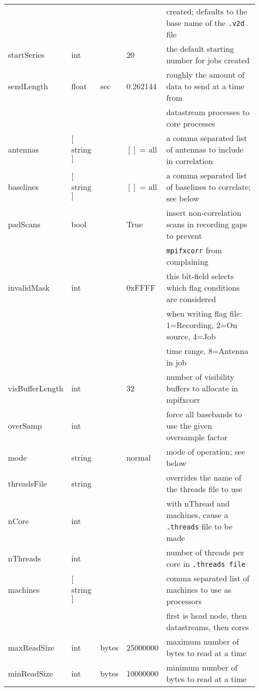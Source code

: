 \begin{center}
\begin{tabular}{l l l l l}
                 &        &       &              & created; defaults to the base name of the {\tt .v2d} file \\
startSeries      & int    &       & 20           & the default starting number for jobs created \\
sendLength       & float  & sec   & 0.262144     & roughly the amount of data to send at a time from \\
                 &        &       &              & datastream processes to core processes \\
antennas         & $[$string$]$ &  & $[ ]$ = all & a comma separated list of antennas to include in correlation \\
baselines        & $[$string$]$ &  & $[ ]$ = all & a comma separated list of baselines to correlate; see below \\
padScans         & bool   &       & True         & insert non-correlation scans in recording gaps to prevent \\
                 &        &       &              & {\tt mpifxcorr} from complaining \\
invalidMask      & int    &       & 0xFFFF       & this bit-field selects which flag conditions are considered \\
                 &        &       &              & when writing flag file: 1=Recording, 2=On source, 4=Job \\
		 &        &       &              & time range, 8=Antenna in job \\
visBufferLength  & int    &       & 32           & number of visibility buffers to allocate in mpifxcorr \\
overSamp         & int    &       &              & force all basebands to use the given oversample factor \\
mode             & string &       & normal       & mode of operation; see below \\
threadsFile      & string &       &              & overrides the name of the threads file to use \\
nCore            & int    &       &              & with nThread and machines, cause a {\tt .threads} file to be made \\
nThreads         & int    &       &              & number of threads per core in {\tt .threads file} \\
machines         & $[$string$]$ & &              & comma separated list of machines to use as processors \\
                 &        &       &              & first is head node, then datastreams, then cores \\
maxReadSize      & int    & bytes & 25000000     & maximum number of bytes to read at a time \\
minReadSize      & int    & bytes & 10000000     & minimum number of bytes to read at a time \\
\hline
\hline
\end{tabular}
\end{center}

